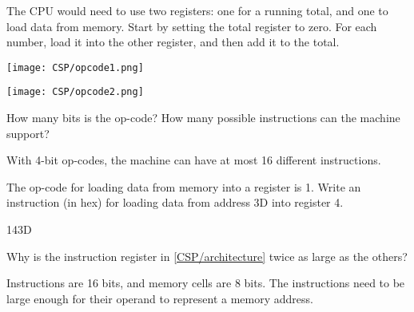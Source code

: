 \documentclass[12pt]{article}
\begin{document}
\begin{answer}[7em]
The CPU would need to use two registers: one for a running total, and one to load data from memory.
Start by setting the total register to zero.
For each number, load it into the other register, and then add it to the total.
\end{answer}




\begin{multicols}{2}
\texttt{[image: CSP/opcode1.png]}

\columnbreak

\texttt{[image: CSP/opcode2.png]}
\end{multicols}




\Q How many bits is the op-code? How many possible instructions can the machine support?

\begin{answer}
With 4-bit op-codes, the machine can have at most 16 different instructions.
\end{answer}


\Q The op-code for loading data from memory into a register is 1. Write an instruction (in hex) for loading data from address 3D into register 4.

\begin{answer}
143D
\end{answer}


\Q Why is the instruction register in \ref{CSP/architecture} twice as large as the others?

\begin{answer}
Instructions are 16 bits, and memory cells are 8 bits. The instructions need to be large enough for their operand to represent a memory address.
\end{answer}
\end{document}
